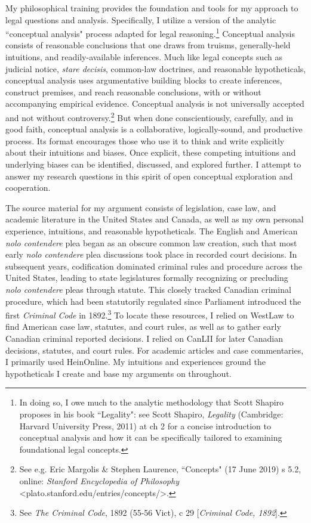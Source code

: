 My philosophical training provides the foundation and tools for my approach to legal questions and analysis. Specifically, I utilize a version of the analytic ``conceptual analysis" process adapted for legal reasoning.\footnote{In doing so, I owe much to the analytic methodology that Scott Shapiro proposes in his book ``Legality": see Scott Shapiro, \textit{Legality} (Cambridge: Harvard University Press, 2011) at ch 2 for a concise introduction to conceptual analysis and how it can be specifically tailored to examining foundational legal concepts.} Conceptual analysis consists of reasonable conclusions that one draws from truisms, generally-held intuitions, and readily-available inferences. Much like legal concepts such as judicial notice, \textit{stare decisis}, common-law doctrines, and reasonable hypotheticals, conceptual analysis uses argumentative building blocks to create inferences, construct premises, and reach reasonable conclusions, with or without accompanying empirical evidence. Conceptual analysis is not universally accepted and not without controversy.\footnote{See e.g. Eric Margolis \& Stephen Laurence, ``Concepts" (17 June 2019) s 5.2, online: \textit{Stanford Encyclopedia of Philosophy} \textless plato.stanford.edu/entries/concepts/\textgreater.} But when done conscientiously, carefully, and in good faith, conceptual analysis is a collaborative, logically-sound, and productive process. Its format encourages those who use it to think and write explicitly about their intuitions and biases. Once explicit, these competing intuitions and underlying biases can be identified, discussed, and explored further. I attempt to answer my research questions in this spirit of open conceptual exploration and cooperation.

The source material for my argument consists of legislation, case law, and academic literature in the United States and Canada, as well as my own personal experience, intuitions, and reasonable hypotheticals. The English and American \textit{nolo contendere} plea began as an obscure common law creation, such that most early \textit{nolo contendere} plea discussions took place in recorded court decisions. In subsequent years, codification dominated criminal rules and procedure across the United States, leading to state legislatures formally recognizing or precluding \textit{nolo contendere} pleas through statute. This closely tracked Canadian criminal procedure, which had been statutorily regulated since Parliament introduced the first \textit{Criminal Code} in 1892.\footnote{See \textit{The Criminal Code}, 1892 (55-56 Vict), c 29 [\textit{Criminal Code, 1892}].} To locate these resources, I relied on WestLaw to find American case law, statutes, and court rules, as well as to gather early Canadian criminal reported decisions. I relied on CanLII for later Canadian decisions, statutes, and court rules. For academic articles and case commentaries, I primarily used HeinOnline. My intuitions and experiences ground the hypotheticals I create and base my arguments on throughout.

